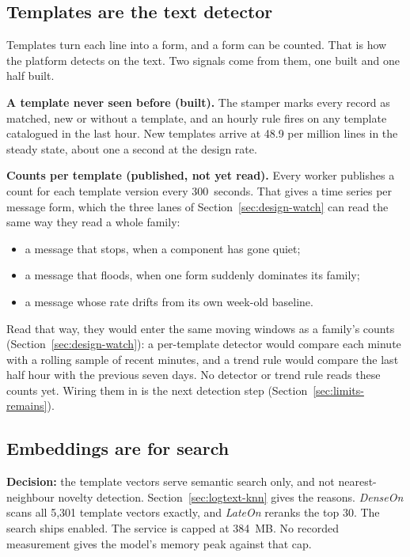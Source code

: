 \subsection{Templates are the text detector}\label{sec:logtext-counts}

Templates turn each line into a form, and a form can be counted. That is how the platform detects on the text. Two signals come from them, one built and one half built.

\textbf{A template never seen before (built).} The stamper marks every record as matched, new or without a template, and an hourly rule fires on any template catalogued in the last hour. New templates arrive at 48.9 per million lines in the steady state, about one a second at the design rate.

\textbf{Counts per template (published, not yet read).} Every worker publishes a count for each template version every 300~seconds. That gives a time series per message form, which the three lanes of Section~\ref{sec:design-watch} can read the same way they read a whole family:

\begin{itemize}
\item a message that stops, when a component has gone quiet;
\item a message that floods, when one form suddenly dominates its family;
\item a message whose rate drifts from its own week-old baseline.
\end{itemize}

Read that way, they would enter the same moving windows as a family's counts (Section~\ref{sec:design-watch}): a per-template detector would compare each minute with a rolling sample of recent minutes, and a trend rule would compare the last half hour with the previous seven days. No detector or trend rule reads these counts yet. Wiring them in is the next detection step (Section~\ref{sec:limits-remains}).

\subsection{Embeddings are for search}\label{sec:logtext-search}

\textbf{Decision:} the template vectors serve semantic search only, and not nearest-neighbour novelty detection. Section~\ref{sec:logtext-knn} gives the reasons. \textit{DenseOn} scans all 5,301 template vectors exactly, and \textit{LateOn} reranks the top 30. The search ships enabled. The service is capped at 384~MB. No recorded measurement gives the model's memory peak against that cap.

